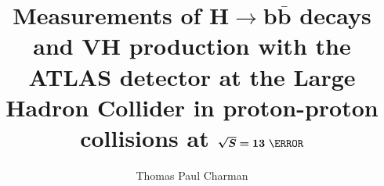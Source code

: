 \documentclass[a4paper,12pt, oneside]{memoir}
\begin{document}
\title{Measurements of $\bm{H\!\to\!b\bar{b}}$ decays and $\bm{V\!H}$ production
  with the ATLAS detector at the Large Hadron Collider in proton-proton
  collisions at $\bm{\sqrt{S}=13}~\TeV$}

\author{Thomas Paul Charman}
\submitdate{\today}

\doublespacing
\maketitle



\clearpage
\newpage
% 

\setcounter{tocdepth}{1}
\tableofcontents
\clearpage
\newpage
\listoffigures
\clearpage
\newpage
\listoftables














\clearpage
\appendix
\begin{appendices}
%
%



%
%
\end{appendices}
\end{document}

